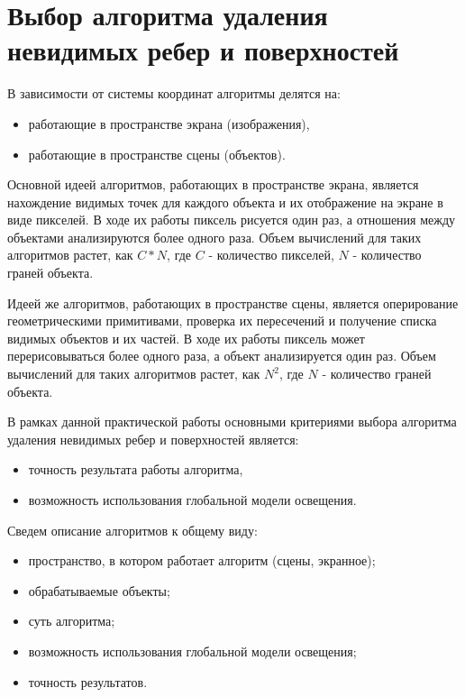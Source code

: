 \section{Выбор алгоритма удаления невидимых ребер и поверхностей}

В зависимости от системы координат алгоритмы делятся на:
\begin{itemize}
    \item работающие в пространстве экрана (изображения),
    \item работающие в пространстве сцены (объектов). \cite{golovnin}
\end{itemize}

Основной идеей алгоритмов, работающих в пространстве экрана, является нахождение видимых точек для каждого объекта и их отображение на экране в виде пикселей.
В ходе их работы пиксель рисуется один раз, а отношения между объектами анализируются более одного раза.
Объем вычислений для таких алгоритмов растет, как $C*N$, где $C$ - количество пикселей, $N$ - количество граней объекта.

Идеей же алгоритмов, работающих в пространстве сцены, является оперирование геометрическими примитивами, проверка их пересечений и получение списка видимых объектов и их частей. 
В ходе их работы пиксель может перерисовываться более одного раза, а объект анализируется один раз.
Объем вычислений для таких алгоритмов растет, как $N^2$, где $N$ - количество граней объекта.

В рамках данной практической работы основными критериями выбора алгоритма удаления невидимых ребер и поверхностей является:
\begin{itemize}
    \item точность результата работы алгоритма,
    \item возможность использования глобальной модели освещения.
\end{itemize}

Сведем описание алгоритмов к общему виду:
\begin{itemize}
    \item пространство, в котором работает алгоритм (сцены, экранное);
    \item обрабатываемые объекты;
    \item суть алгоритма;
    \item возможность использования глобальной модели освещения;
    \item точность результатов.
\end{itemize}


